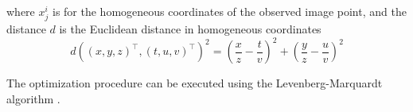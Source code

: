 where \( x_j^i \) is for the homogeneous coordinates of the observed image point, and the distance \( d \) is the Euclidean distance in homogeneous coordinates
\begin{equation}
	d \left( (x, y, z)^\top, (t, u, v)^\top \right)^2 = \left( \frac{x}{z} - \frac{t}{v} \right)^2 + \left( \frac{y}{z} - \frac{u}{v} \right)^2
\end{equation}

The optimization procedure can be executed using the Levenberg-Marquardt algorithm \cite{14-levenberg}.

